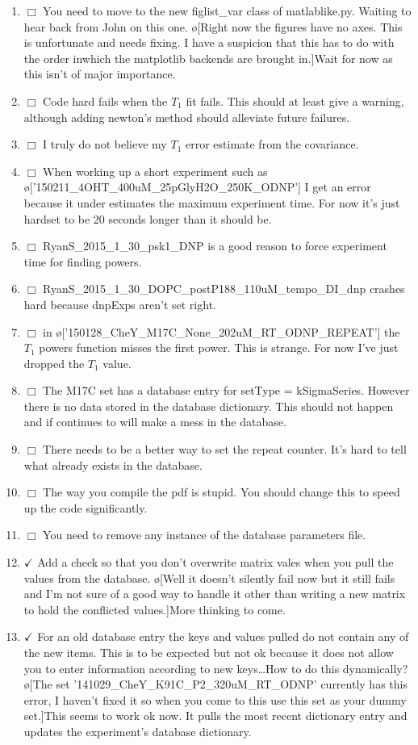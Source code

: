 \documentclass[10pt]{book}
\begin{document}
\begin{enumerate}
    \item $\Box$ You need to move to the new figlist\_var class of matlablike.py. Waiting to hear back from John on this one. \o[Right now the figures have no axes. This is unfortunate and needs fixing. I have a suspicion that this has to do with the order inwhich the matplotlib backends are brought in.]{Wait for now as this isn't of major importance.}
    \item $\Box$ Code hard fails when the $T_1$ fit fails. This should at least give a warning, although adding newton's method should alleviate future failures.
    \item $\Box$ I truly do not believe my $T_1$ error estimate from the covariance.
    \item $\Box$ When working up a short experiment such as \o['150211_4OHT_400uM_25pGlyH2O_250K_ODNP']{} I get an error because it under estimates the maximum experiment time. For now it's just hardset to be 20 seconds longer than it should be.
    \item $\Box$ RyanS_2015_1_30_psk1_DNP is a good reason to force experiment time for finding powers.
    \item $\Box$ RyanS_2015_1_30_DOPC_postP188_110uM_tempo_DI_dnp crashes hard because dnpExps aren't set right. 
    \item $\Box$ in \o['150128_CheY_M17C_None_202uM_RT_ODNP_REPEAT']{} the $T_1$ powers function misses the first power. This is strange. For now I've just dropped the $T_1$ value.
    \item $\Box$ The M17C set has a database entry for setType = kSigmaSeries. However there is no data stored in the database dictionary. This should not happen and if continues to will make a mess in the database.
    \item $\Box$ There needs to be a better way to set the repeat counter. It's hard to tell what already exists in the database.
    \item $\Box$ The way you compile the pdf is stupid. You should change this to speed up the code significantly.
    \item $\Box$ You need to remove any instance of the database parameters file.
    \item $\checkmark$ Add a check so that you don't overwrite matrix vales when you pull the values from the database. \o[Well it doesn't silently fail now but it still fails and I'm not sure of a good way to handle it other than writing a new matrix to hold the conflicted values.]{More thinking to come.}
    \item $\checkmark$ For an old database entry the keys and values pulled do not contain any of the new items. This is to be expected but not ok because it does not allow you to enter information according to new keys\ldots How to do this dynamically? \o[The set '141029_CheY_K91C_P2_320uM_RT_ODNP' currently has this error, I haven't fixed it so when you come to this use this set as your dummy set.]{This seems to work ok now. It pulls the most recent dictionary entry and updates the experiment's database dictionary.}

\end{enumerate}
\end{document}
